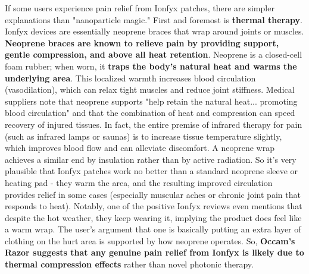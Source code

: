 \documentclass{article}
\begin{document}
If some users experience pain relief from Ionfyx patches, there are simpler explanations than "nanoparticle magic." First and foremost is \textbf{thermal therapy}. Ionfyx devices are essentially neoprene braces that wrap around joints or muscles. \textbf{Neoprene braces are known to relieve pain by providing support, gentle compression, and above all heat retention}. Neoprene is a closed-cell foam rubber; when worn, it \textbf{traps the body's natural heat and warms the underlying area}. This localized warmth increases blood circulation (vasodilation), which can relax tight muscles and reduce joint stiffness. Medical suppliers note that neoprene supports "help retain the natural heat... promoting blood circulation" and that the combination of heat and compression can speed recovery of injured tissues. In fact, the entire premise of infrared therapy for pain (such as infrared lamps or saunas) is to increase tissue temperature slightly, which improves blood flow and can alleviate discomfort. A neoprene wrap achieves a similar end by insulation rather than by active radiation. So it's very plausible that Ionfyx patches work no better than a standard neoprene sleeve or heating pad - they warm the area, and the resulting improved circulation provides relief in some cases (especially muscular aches or chronic joint pain that responds to heat). Notably, one of the positive Ionfyx reviews even mentions that despite the hot weather, they keep wearing it, implying the product does feel like a warm wrap. The user's argument that one is basically putting an extra layer of clothing on the hurt area is supported by how neoprene operates. So, \textbf{Occam's Razor suggests that any genuine pain relief from Ionfyx is likely due to thermal compression effects} rather than novel photonic therapy.
\end{document}
